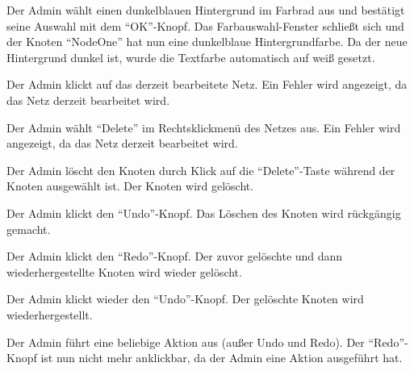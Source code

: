 \documentclass[parskip=full,11pt,twoside]{scrartcl}
\begin{document}
{Der Admin wählt einen dunkelblauen Hintergrund im Farbrad aus und bestätigt seine Auswahl mit dem \enquote{OK}-Knopf.}
{Das Farbauswahl-Fenster schließt sich und der Knoten \enquote{NodeOne} hat nun eine dunkelblaue Hintergrundfarbe. Da der neue Hintergrund dunkel ist, wurde die Textfarbe automatisch auf weiß gesetzt.}


{Der Admin klickt auf das derzeit bearbeitete Netz.}
{Ein Fehler wird angezeigt, da das Netz derzeit bearbeitet wird.}

{Der Admin wählt \enquote{Delete} im Rechtsklickmenü des Netzes aus.}
{Ein Fehler wird angezeigt, da das Netz derzeit bearbeitet wird.}


{Der Admin löscht den Knoten durch Klick auf die \enquote{Delete}-Taste während der Knoten ausgewählt ist.}
{Der Knoten wird gelöscht.}

{Der Admin klickt den \enquote{Undo}-Knopf.}
{Das Löschen des Knoten wird rückgängig gemacht.}

{Der Admin klickt den \enquote{Redo}-Knopf.}
{Der zuvor gelöschte und dann wiederhergestellte Knoten wird wieder gelöscht.}

{Der Admin klickt wieder den \enquote{Undo}-Knopf.}
{Der gelöschte Knoten wird wiederhergestellt.}

{Der Admin führt eine beliebige Aktion aus (außer Undo und Redo).}
{Der \enquote{Redo}-Knopf ist nun nicht mehr anklickbar, da der Admin eine Aktion ausgeführt hat.}

\end{document}
